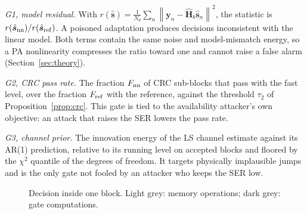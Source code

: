 \documentclass[journal]{IEEEtran}
\newcommand{\norm}[1]{\left\lVert #1 \right\rVert}
\begin{document}
\textit{G1, model residual.} With $r(\hat{\bm s})=\tfrac1{N_d}\sum_n\norm{\bm y_n-\hat{\bm
H}_b\hat{\bm s}_n}^2$, the statistic is $r(\hat{\bm s}_{\rm nn})/r(\hat{\bm s}_{\rm ref})$. A
poisoned adaptation produces decisions inconsistent with the linear model. Both terms
contain the same noise and model-mismatch energy, so a PA nonlinearity compresses the
ratio toward one and cannot raise a false alarm (Section~\ref{sec:theory}).

\textit{G2, CRC pass rate.} The fraction $F_{\rm nn}$ of CRC sub-blocks that pass with the
fast level, over the fraction $F_{\rm ref}$ with the reference, against the threshold
$\tau_2$ of Proposition~\ref{prop:crc}. This gate is tied to the availability attacker's
own objective: an attack that raises the SER lowers the pass rate.

\textit{G3, channel prior.} The innovation energy of the LS channel estimate against its
AR(1) prediction, relative to its running level on accepted blocks and floored by the
$\chi^2$ quantile of the degrees of freedom. It targets physically implausible jumps and
is the only gate not fooled by an attacker who keeps the SER low.

\begin{figure}[t]
\centering
{}
\caption{Decision inside one block. Light grey: memory operations; dark grey: gate
computations.}
\label{fig:gateflow}
\end{figure}
\end{document}
